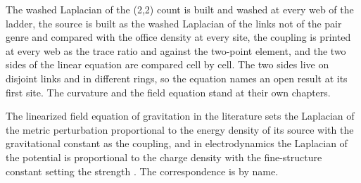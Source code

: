 The washed Laplacian of the (2,2) count is built and washed at every web of the ladder, the source is built as the washed Laplacian of the links not of the pair genre and compared with the office density at every site, the coupling is printed at every web as the trace ratio and against the two-point element, and the two sides of the linear equation are compared cell by cell. The two sides live on disjoint links and in different rings, so the equation names an open result at its first site. The curvature and the field equation stand at their own chapters.
\begin{chbridge}
The linearized field equation of gravitation in the literature sets the Laplacian of the metric perturbation proportional to the energy density of its source with the gravitational constant as the coupling, and in electrodynamics the Laplacian of the potential is proportional to the charge density with the fine-structure constant setting the strength \cite{Einstein1916,Peskin1995}. The correspondence is by name.
\end{chbridge}
